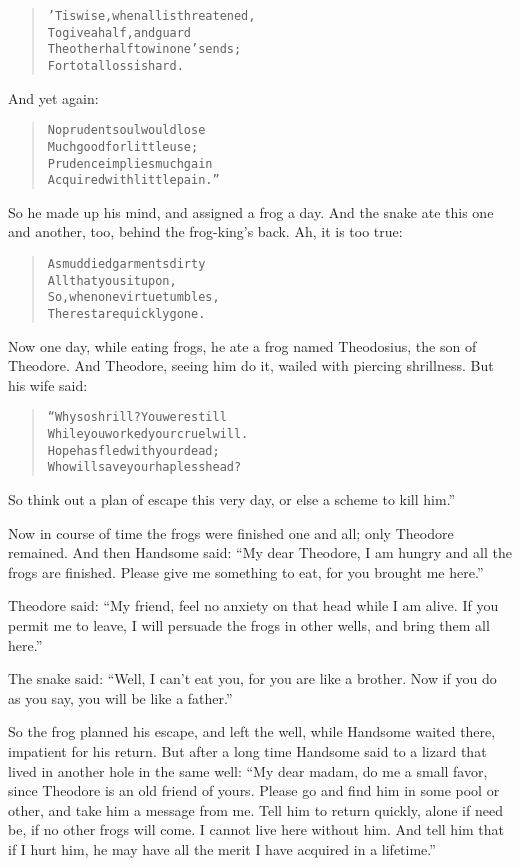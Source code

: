 \documentclass[article, twoside, 14pt]{memoir}
\renewenvironment{verbatim}{%
\begin{quote}%
\vskip -10pt%
\begin{alltt}\normalfont\large}{\end{alltt}%
\end{quote}%
\vskip -10pt
} %
\begin{document}
\begin{verbatim}
'Tis wise, when all is threatened,
    To give a half, and guard
The other half to win one's ends;
    For total loss is hard.
\end{verbatim}
And yet again:

\begin{verbatim}
No prudent soul would lose
Much good for little use;
Prudence implies much gain
Acquired with little pain.”
\end{verbatim}
So he made up his mind, and assigned a frog a day. And the snake
ate this one and another, too, behind the frog-king's back. Ah, it
is too true:

\begin{verbatim}
As muddied garments dirty
    All that you sit upon,
So, when one virtue tumbles,
    The rest are quickly gone.
\end{verbatim}
Now one day, while eating frogs, he ate a frog named
Theodosius, the son of Theodore. And Theodore, seeing him do it,
wailed with piercing shrillness. But his wife said:

\begin{verbatim}
“Why so shrill? You were still
While you worked your cruel will.
Hope has fled with your dead;
Who will save your hapless head?
\end{verbatim}
So think out a plan of escape this very day, or else a scheme to
kill him.”

Now in course of time the frogs were finished one and all; only
Theodore remained. And then Handsome said:
``My dear Theodore, I am hungry and all the frogs are finished. Please give me something to eat, for you brought me here.''

Theodore said:
``My friend, feel no anxiety on that head while I am alive. If you permit me to leave, I will persuade the frogs in other wells, and bring them all here.''

The snake said:
``Well, I can't eat you, for you are like a brother. Now if you do as you say, you will be like a father.''

So the frog planned his escape, and left the well, while Handsome
waited there, impatient for his return. But after a long time
Handsome said to a lizard that lived in another hole in the same
well:
``My dear madam, do me a small favor, since Theodore is an old friend of yours. Please go and find him in some pool or other, and take him a message from me. Tell him to return quickly, alone if need be, if no other frogs will come. I cannot live here without him. And tell him that if I hurt him, he may have all the merit I have acquired in a lifetime.''
\end{document}
